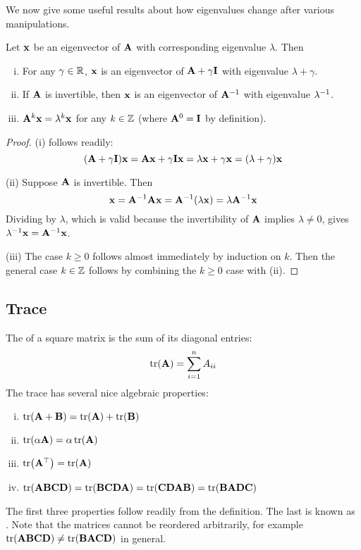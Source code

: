 We now give some useful results about how eigenvalues change after various manipulations.
\begin{proposition}
Let $\mathbf{x}$ be an eigenvector of $\mathbf{A}$ with corresponding eigenvalue $\lambda$.
Then
\begin{enumerate}[(i)]
\item For any $\gamma \in \mathbb{R}$, $\mathbf{x}$ is an eigenvector of $\mathbf{A} + \gamma\mathbf{I}$ with eigenvalue $\lambda + \gamma$.
\item If $\mathbf{A}$ is invertible, then $\mathbf{x}$ is an eigenvector of $\mathbf{A}^{-1}$ with eigenvalue $\lambda^{-1}$.
\item $\mathbf{A}^k\mathbf{x} = \lambda^k\mathbf{x}$ for any $k \in \mathbb{Z}$ (where $\mathbf{A}^0 = \mathbf{I}$ by definition).
\end{enumerate}
\end{proposition}
\begin{proof}
(i) follows readily:
\[(\mathbf{A} + \gamma\mathbf{I})\mathbf{x} = \mathbf{A}\mathbf{x} + \gamma\mathbf{I}\mathbf{x} = \lambda\mathbf{x} + \gamma\mathbf{x} = (\lambda + \gamma)\mathbf{x}\]

(ii) Suppose $\mathbf{A}$ is invertible. Then
\[\mathbf{x} = \mathbf{A}^{-1}\mathbf{A}\mathbf{x} = \mathbf{A}^{-1}(\lambda\mathbf{x}) = \lambda\mathbf{A}^{-1}\mathbf{x}\]
Dividing by $\lambda$, which is valid because the invertibility of $\mathbf{A}$ implies $\lambda \neq 0$, gives $\lambda^{-1}\mathbf{x} = \mathbf{A}^{-1}\mathbf{x}$.

(iii) The case $k \geq 0$ follows almost immediately by induction on $k$.
Then the general case $k \in \mathbb{Z}$ follows by combining the $k \geq 0$ case with (ii).
\end{proof}

\subsection{Trace}
The  of a square matrix is the sum of its diagonal entries:
\[\tr(\mathbf{A}) = \sum_{i=1}^n A_{ii}\]
The trace has several nice algebraic properties:
\begin{enumerate}[(i)]
\item $\tr(\mathbf{A}+\mathbf{B}) = \tr(\mathbf{A}) + \tr(\mathbf{B})$
\item $\tr(\alpha \mathbf{A}) = \alpha\tr(\mathbf{A})$
\item $\tr(\mathbf{A}^\top) = \tr(\mathbf{A})$
\item $\tr(\mathbf{A}\mathbf{B}\mathbf{C}\mathbf{D}) = \tr(\mathbf{B}\mathbf{C}\mathbf{D}\mathbf{A}) = \tr(\mathbf{C}\mathbf{D}\mathbf{A}\mathbf{B}) = \tr(\mathbf{B}\mathbf{A}\mathbf{D}\mathbf{C})$
\end{enumerate}
The first three properties follow readily from the definition.
The last is known as . Note that the matrices cannot be reordered arbitrarily, for example $\tr(\mathbf{A}\mathbf{B}\mathbf{C}\mathbf{D}) \neq \tr(\mathbf{B}\mathbf{A}\mathbf{C}\mathbf{D})$ in general.

